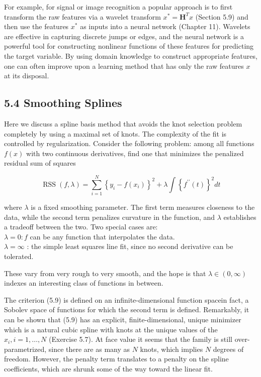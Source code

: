 \documentclass[10pt]{article}
\begin{document}
For example, for signal or image recognition a popular approach is to first transform the raw features via a wavelet transform $x^{*}=\mathbf{H}^{T} x$ (Section 5.9) and then use the features $x^{*}$ as inputs into a neural network (Chapter 11). Wavelets are effective in capturing discrete jumps or edges, and the neural network is a powerful tool for constructing nonlinear functions of these features for predicting the target variable. By using domain knowledge to construct appropriate features, one can often improve upon a learning method that has only the raw features $x$ at its disposal.

\subsection*{5.4 Smoothing Splines}
Here we discuss a spline basis method that avoids the knot selection problem completely by using a maximal set of knots. The complexity of the fit is controlled by regularization. Consider the following problem: among all functions $f(x)$ with two continuous derivatives, find one that minimizes the penalized residual sum of squares


\begin{equation*}
\operatorname{RSS}(f, \lambda)=\sum_{i=1}^{N}\left\{y_{i}-f\left(x_{i}\right)\right\}^{2}+\lambda \int\left\{f^{\prime \prime}(t)\right\}^{2} d t \tag{5.9}
\end{equation*}


where $\lambda$ is a fixed smoothing parameter. The first term measures closeness to the data, while the second term penalizes curvature in the function, and $\lambda$ establishes a tradeoff between the two. Two special cases are:\\
$\lambda=0: f$ can be any function that interpolates the data.\\
$\lambda=\infty$ : the simple least squares line fit, since no second derivative can be tolerated.

These vary from very rough to very smooth, and the hope is that $\lambda \in(0, \infty)$ indexes an interesting class of functions in between.

The criterion (5.9) is defined on an infinite-dimensional function spacein fact, a Sobolev space of functions for which the second term is defined. Remarkably, it can be shown that (5.9) has an explicit, finite-dimensional, unique minimizer which is a natural cubic spline with knots at the unique values of the $x_{i}, i=1, \ldots, N$ (Exercise 5.7). At face value it seems that the family is still over-parametrized, since there are as many as $N$ knots, which implies $N$ degrees of freedom. However, the penalty term translates to a penalty on the spline coefficients, which are shrunk some of the way toward the linear fit.
\end{document}
